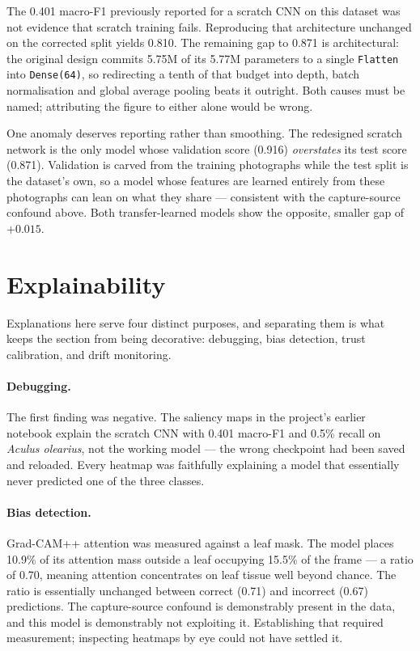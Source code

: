 \documentclass[sigconf,nonacm]{acmart}
\begin{document}
The 0.401 macro-F1 previously reported for a scratch CNN on this dataset was not
evidence that scratch training fails. Reproducing that architecture unchanged on
the corrected split yields 0.810. The remaining gap to 0.871 is architectural:
the original design commits 5.75M of its 5.77M parameters to a single
\texttt{Flatten} into \texttt{Dense(64)}, so redirecting a tenth of that budget
into depth, batch normalisation and global average pooling beats it outright.
Both causes must be named; attributing the figure to either alone would be wrong.

One anomaly deserves reporting rather than smoothing. The redesigned scratch
network is the only model whose validation score (0.916) \emph{overstates} its
test score (0.871). Validation is carved from the training photographs while the
test split is the dataset's own, so a model whose features are learned entirely
from these photographs can lean on what they share --- consistent with the
capture-source confound above. Both transfer-learned models show the opposite,
smaller gap of $+0.015$.

\section{Explainability}
\label{sec:xai}

Explanations here serve four distinct purposes, and separating them is what keeps
the section from being decorative: debugging, bias detection, trust calibration,
and drift monitoring.

\paragraph{Debugging.} The first finding was negative. The saliency maps in the
project's earlier notebook explain the scratch CNN with 0.401 macro-F1 and 0.5\%
recall on \emph{Aculus olearius}, not the working model --- the wrong checkpoint
had been saved and reloaded. Every heatmap was faithfully explaining a model that
essentially never predicted one of the three classes.

\paragraph{Bias detection.} Grad-CAM++ attention was measured against a leaf
mask. The model places 10.9\% of its attention mass outside a leaf occupying
15.5\% of the frame --- a ratio of 0.70, meaning attention concentrates on leaf
tissue well beyond chance. The ratio is essentially unchanged between correct
(0.71) and incorrect (0.67) predictions. The capture-source confound is
demonstrably present in the data, and this model is demonstrably not exploiting
it. Establishing that required measurement; inspecting heatmaps by eye could not
have settled it.
\end{document}
